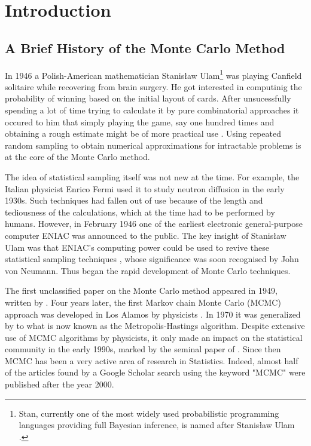 \documentclass[report.tex]{subfiles}
\begin{document}
\chapter{Introduction}

\section{A Brief History of the Monte Carlo Method}
\label{chapter1-introduction}

In 1946 a Polish-American mathematician Stanisław Ulam\footnote{
  Stan, currently one of the most widely used probabilistic programming languages
  providing full Bayesian inference, is named after Stanisław Ulam
  \cite{stanReferenceManual}.
}
was playing Canfield solitaire while recovering from brain surgery.
He got interested in computinig the probability of winning based on the initial
layout of cards. After unsucessfully spending a lot of time trying to calculate it
by pure combinatorial approaches it occured to him that simply playing the
game, say one hundred times and obtaining a rough estimate might be of more
practical use \cite{eckhardt1987stan}. Using repeated random sampling
to obtain numerical approximations for intractable problems is at the
core of the Monte Carlo method.

The idea of statistical sampling itself was not new at the time. For example,
the Italian physicist Enrico Fermi used it to study neutron diffusion in the
early 1930s. Such techniques had fallen out of use because of the
length and tediousness of the calculations, which at the time had to be
performed by humans. However, in February 1946 one of the earliest electronic
general-purpose computer ENIAC was announced to the public. The key insight of
Stanisław Ulam was that ENIAC's computing power could be used to revive these
statistical sampling techniques \cite{metropolis1987beginning}, whose significance
was soon recognised by John von Neumann. Thus began the rapid development of
Monte Carlo techniques.

The first unclassified paper on the Monte Carlo method appeared in 1949, written
by \citet{metropolis1949monte}. Four years later, the first Markov chain Monte Carlo
(MCMC) approach was developed in Los Alamos by physicists \citet{metropolis1953equation}.
In 1970 it was generalized by \citet{hastings1970monte} to what is now
known as the Metropolis-Hastings algorithm. Despite extensive
use of MCMC algorithms by physicists, it only made an impact on the statistical
community in the early 1990s, marked by the seminal paper of
\citet{gelfand1990sampling}. Since then MCMC has been a very active area of
research in Statistics. Indeed, almost half of the articles found by a
Google Scholar search using the keyword "MCMC" were published after the year 2000.
\end{document}
